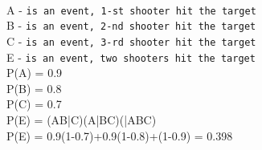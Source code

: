 \documentclass[11pt]{article}
\begin{document}
\\ A - \texttt{is an event, 1-st shooter hit the target}
\\ B - \texttt{is an event, 2-nd shooter hit the target}
\\ C - \texttt{is an event, 3-rd shooter hit the target}
\\ E - \texttt{is an event, two shooters hit the target}
\\ P(A) = 0.9
\\ P(B) = 0.8
\\ P(C) = 0.7
\\ P(E) = (A\cap B\cap \bar{C})\cup(A\cap \bar{B}\cap C)\cup(\bar{A}\cap B\cap C)
\\ P(E) = 0.9\times(1-0.7)+0.9\times(1-0.8)+(1-0.9) = 0.398
\end{document}
